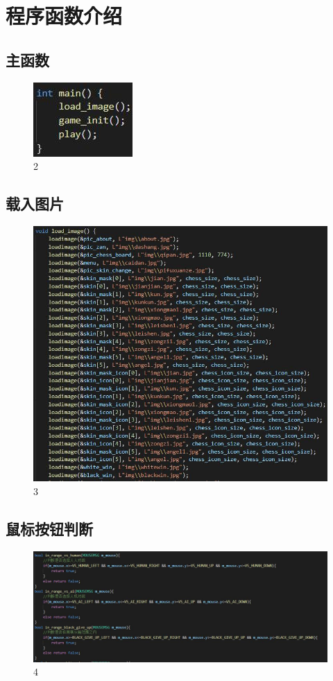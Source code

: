 \documentclass[UTF8]{ctexart}
\begin{document}
\section{程序函数介绍}
\subsection{主函数}
\begin{figure}[H]
    \centering
    \includegraphics[scale=2.0]{1.jpg}
    \caption{2}
\end{figure}
\subsection{载入图片}
\begin{figure}[H]
    \centering
    \includegraphics[scale=0.8]{2.jpg}
\caption{3}
\end{figure}
\subsection{鼠标按钮判断}
\begin{figure}[H]
    \centering
    \includegraphics[scale=0.6]{3.jpg}
\caption{4}
\end{figure}
\end{document}
